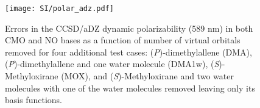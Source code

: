 \begin{figure}
  \centering
  \texttt{[image: SI/polar\_adz.pdf]}
  \caption{{\footnotesize Errors in the CCSD/aDZ dynamic polarizability (589
nm) in both CMO and NO bases as a function of number of virtual orbitals
removed for four additional test cases: (\textit{P})-dimethylallene (DMA),
   (\textit{P})-dimethylallene and one water molecule (DMA1w), (\textit{S})-Methyloxirane
(MOX), and (\textit{S})-Methyloxirane and two water molecules with one of the water
molecules removed leaving only its basis functions.}}
   \label{fig:polar_adz}
\end{figure}
